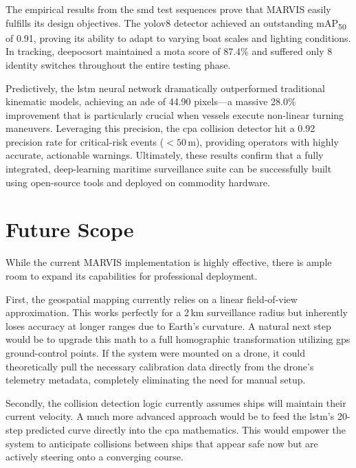 The empirical results from the \gls{smd} test sequences prove that MARVIS easily fulfills its design objectives. The \gls{yolov8} detector achieved an outstanding mAP\textsubscript{50} of 0.91, proving its ability to adapt to varying boat scales and lighting conditions. In tracking, \gls{deepocsort} maintained a \gls{mota} score of 87.4\% and suffered only 8 identity switches throughout the entire testing phase. 

Predictively, the \gls{lstm} neural network dramatically outperformed traditional kinematic models, achieving an \gls{ade} of 44.90 pixels—a massive 28.0\% improvement that is particularly crucial when vessels execute non-linear turning maneuvers. Leveraging this precision, the \gls{cpa} collision detector hit a 0.92 precision rate for critical-risk events ($<50$\,m), providing operators with highly accurate, actionable warnings. Ultimately, these results confirm that a fully integrated, deep-learning maritime surveillance suite can be successfully built using open-source tools and deployed on commodity hardware.

\section{Future Scope}

While the current MARVIS implementation is highly effective, there is ample room to expand its capabilities for professional deployment.

First, the geospatial mapping currently relies on a linear field-of-view approximation. This works perfectly for a 2\,km surveillance radius but inherently loses accuracy at longer ranges due to Earth's curvature. A natural next step would be to upgrade this math to a full homographic transformation utilizing \gls{gps} ground-control points. If the system were mounted on a drone, it could theoretically pull the necessary calibration data directly from the drone's telemetry metadata, completely eliminating the need for manual setup.

Secondly, the collision detection logic currently assumes ships will maintain their current velocity. A much more advanced approach would be to feed the \gls{lstm}'s 20-step predicted curve directly into the \gls{cpa} mathematics. This would empower the system to anticipate collisions between ships that appear safe now but are actively steering onto a converging course. 

